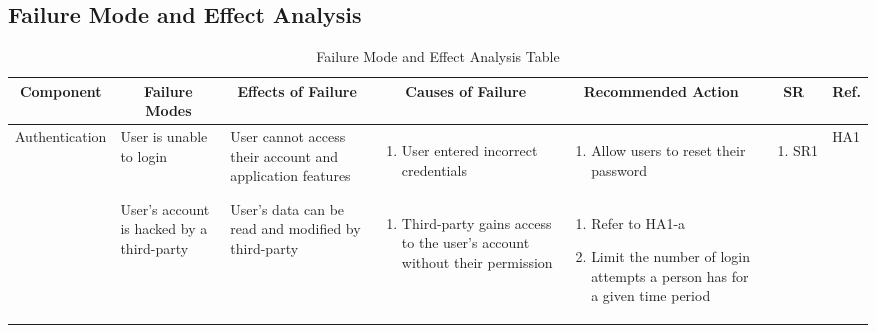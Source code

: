 \documentclass{article}
\begin{document}
\newpage
\begin{landscape}
    \section{Failure Mode and Effect Analysis}
    \begin{longtable}{|p{}|p{}|p{}|p{}|p{}|p{}|p{}|}
        \caption{Failure Mode and Effect Analysis Table}  \\
		\hline
        \multicolumn{1}{|c|}{\textbf{Component}}
		& \multicolumn{1}{|c|}{\textbf{Failure Modes}}
		& \multicolumn{1}{|c|}{\textbf{Effects of Failure}}
		& \multicolumn{1}{|c|}{\textbf{Causes of Failure}}
		& \multicolumn{1}{|c|}{\textbf{Recommended Action}}
		& \multicolumn{1}{|c|}{\textbf{SR}}
		& \multicolumn{1}{|c|}{\textbf{Ref.}}  \\
        \hline
        Authenti\-cation
        & User is unable to login
        & User cannot access their account and application features
        & \begin{enumerate}[label=\alph*., leftmargin=*]
            \item User entered incorrect credentials
        \end{enumerate}
        & \begin{enumerate}[label=\alph*., leftmargin=*]
            \item Allow users to reset their password
        \end{enumerate}
        & \begin{enumerate}[label=\alph*., leftmargin=*]
            \item SR1
        \end{enumerate}
        & HA1 \\
        \cline{2-7}
        & User's account is hacked by a third-party
        & User's data can be read and modified by third-party
        & \begin{enumerate}[label=\alph*., leftmargin=*]
            \item Third-party gains access to the  user's account without their permission
        \end{enumerate}
        & \begin{enumerate}[label=\alph*., leftmargin=*]
            \item Refer to HA1-a
            \item Limit the number of login attempts a person has for a given time period

\end{enumerate}
\end{longtable}
\end{landscape}
\end{document}
